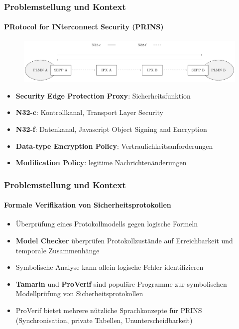 \documentclass{beamer}
\begin{document}
\begin{frame}
    \frametitle{Problemstellung und Kontext}
    \framesubtitle{PRotocol for INterconnect Security (PRINS)}

    \begin{figure}
    \centering
    \includegraphics[width=\linewidth]{n32-interface-short.pdf}
    \end{figure}

    \begin{itemize}
        \item<2-> \textbf{Security Edge Protection Proxy}: Sicherheitsfunktion
        \item<3-> \textbf{N32-c}: Kontrollkanal, Transport Layer Security
        \item<3-> \textbf{N32-f}: Datenkanal, Javascript Object Signing and Encryption
        \item<4-> \textbf{Data-type Encryption Policy}: Vertraulichkeitsanforderungen
        \item<4-> \textbf{Modification Policy}: legitime Nachrichtenänderungen
    \end{itemize}
\end{frame}

\begin{frame}
    \frametitle{Problemstellung und Kontext}
    \framesubtitle{Formale Verifikation von Sicherheitsprotokollen}

    \begin{itemize}
        \item<1-> Überprüfung eines Protokollmodells gegen logische Formeln
        \vspace*{2mm}
        \item<2-> \textbf{Model Checker} überprüfen Protokollzustände auf Erreichbarkeit und temporale Zusammenhänge
        \vspace*{2mm}
        \item<3-> Symbolische Analyse kann allein logische Fehler identifizieren
        \vspace*{2mm}
        \item<4-> \textbf{Tamarin} und \textbf{ProVerif} sind populäre Programme zur symbolischen Modellprüfung von Sicherheitsprotokollen
        \vspace*{2mm}
        \item<5-> ProVerif bietet mehrere nützliche Sprachkonzepte für PRINS (Synchronisation, private Tabellen, Ununterscheidbarkeit)
    \end{itemize}
\end{frame}
\end{document}
